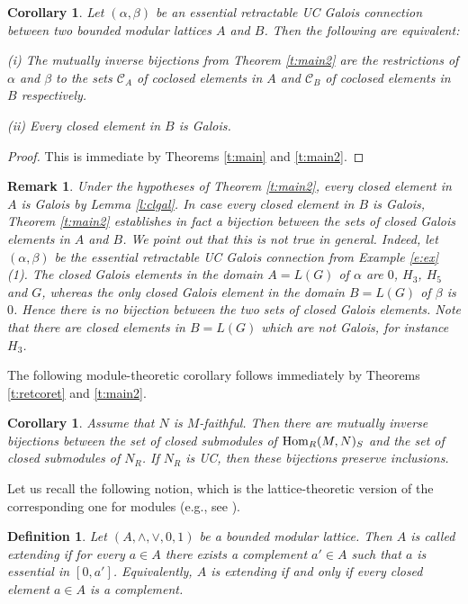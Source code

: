 \documentclass[11pt,a4paper]{amsart}
\newtheorem{cor}[theorem]{Corollary}
\newtheorem{defn}[theorem]{Definition}
\newtheorem{rem}[theorem]{Remark}
\begin{document}
\begin{cor} \label{c:bij} Let $(\alpha,\beta)$ be an essential retractable UC Galois connection between two bounded
modular lattices $A$ and $B$. Then the following are equivalent:

(i) The mutually inverse bijections from Theorem \ref{t:main2} are the restrictions of $\alpha$ and $\beta$ to
the sets $\mathcal{C}_A$ of coclosed elements in $A$ and $\mathcal{C}_B$ of coclosed elements in $B$ respectively.

(ii) Every closed element in $B$ is Galois.
\end{cor}

\begin{proof} This is immediate by Theorems \ref{t:main} and \ref{t:main2}.
\end{proof}

\begin{rem} \rm Under the hypotheses of Theorem \ref{t:main2}, every closed element in $A$ is Galois by
Lemma \ref{l:clgal}. In case every closed element in $B$ is Galois, Theorem \ref{t:main2} establishes in fact a
bijection between the sets of closed Galois elements in $A$ and $B$. We point out that this is not true in general.
Indeed, let $(\alpha,\beta)$ be the essential retractable UC Galois connection from Example \ref{e:ex} (1). The closed
Galois elements in the domain $A=L(G)$ of $\alpha$ are $0$, $H_3$, $H_5$ and $G$, whereas the only closed Galois
element in the domain $B=L(G)$ of $\beta$ is $0$. Hence there is no bijection between the two sets of
closed Galois elements. Note that there are closed elements in $B=L(G)$ which are not Galois, for instance $H_3$.
\end{rem}

The following module-theoretic corollary follows immediately by Theorems \ref{t:retcoret} and \ref{t:main2}.

\begin{cor} {\rm \cite[Theorem~1.2]{Z}} Assume that $N$ is $M$-faithful. Then there are mutually inverse bijections
between the set of closed submodules of ${{\rm Hom}}_R(M,N)_S$ and the set of closed submodules of $N_R$. If $N_R$ is UC, then
these bijections preserve inclusions. 
\end{cor}

Let us recall the following notion, which is the lattice-theoretic version of the corresponding one for modules
(e.g., see \cite{DHSW}).

\begin{defn} \label{d:extending} \rm Let $(A,\wedge,\vee,0,1)$ be a bounded modular lattice. Then $A$ is called {\it
extending} if for every $a\in A$ there exists a complement $a'\in A$ such that $a$ is essential in $[0,a']$.
Equivalently, $A$ is extending if and only if every closed element $a\in A$ is a complement.
\end{defn}
\end{document}
